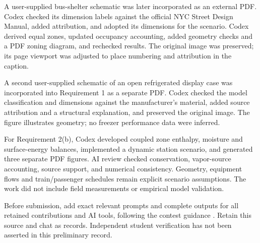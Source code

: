 \documentclass[12pt]{article}
\begin{document}
A user-supplied bus-shelter schematic was later incorporated as an external PDF.
Codex checked its dimension labels against the official NYC Street Design Manual,
added attribution, and adopted its dimensions for the scenario. Codex derived
equal zones, updated occupancy accounting, added geometry checks and a PDF
zoning diagram, and rechecked results. The original image was preserved; its
page viewport was adjusted to place numbering and attribution in the caption.

A second user-supplied schematic of an open refrigerated display case was
incorporated into Requirement 1 as a separate PDF. Codex checked the model
classification and dimensions against the manufacturer's material, added source
attribution and a structural explanation, and preserved the original image.
The figure illustrates geometry; no freezer performance data were inferred.

For Requirement 2(b), Codex developed coupled zone enthalpy, moisture and
surface-energy balances, implemented a dynamic station scenario, and generated
three separate PDF figures. AI review checked conservation, vapor-source
accounting, source support, and numerical consistency. Geometry, equipment
flows and train/passenger schedules remain explicit scenario assumptions.
The work did not include field measurements or empirical model validation.

Before submission, add exact relevant prompts and complete outputs for all
retained contributions and AI tools, following the contest guidance \cite{aipolicy}.
Retain this source and chat as records. Independent student verification has
not been asserted in this preliminary record.
\end{document}
